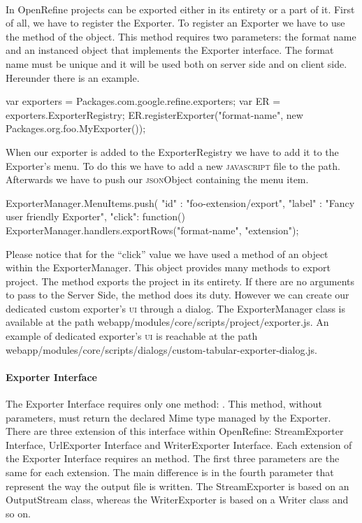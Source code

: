 \paragraph{} In OpenRefine projects can be exported either in its entirety or a part of it. First of all, we have to register the Exporter. To register an Exporter we have to use the  method of the  object. This method requires two parameters: the format name and an instanced object that implements the Exporter interface. The format name must be unique and it will be used both on server side and on client side. Hereunder there is an example.
\begin{code}
var exporters = Packages.com.google.refine.exporters;
var ER = exporters.ExporterRegistry;
ER.registerExporter("format-name", 
     new Packages.org.foo.MyExporter()); 
\end{code} 
When our exporter is added to the ExporterRegistry we have to add it to the Exporter's menu. To do this we have to add a new \textsc{javascript} file to the path. Afterwards we have to push our \textsc{json}Object containing the menu item. 
\begin{code}
ExporterManager.MenuItems.push(
{
   "id" : "foo-extension/export",
   "label" : "Fancy user friendly Exporter",
   "click": function() { 
      ExporterManager.handlers.exportRows("format-name",
                                          "extension");
   }
}
\end{code}
Please notice that for the ``click'' value we have used a method of an object within the ExporterManager. This object provides many methods to export project. The  method exports the project in its entirety. If there are no arguments to pass to the Server Side, the  method does its duty. However we can create our dedicated custom exporter's \textsc{ui} through a dialog. The ExporterManager class is available at the path \textsf{webapp/modules/core/scripts/project/exporter.js}. An example of dedicated exporter's \textsc{ui} is reachable at the path \textsf{webapp/modules/core/scripts/dialogs/custom-tabular-exporter-dialog.js}.

\paragraph{Exporter Interface} The Exporter Interface requires only one method: . This method, without parameters, must return the declared Mime type managed by the Exporter. There are three extension of this interface within OpenRefine: StreamExporter Interface, UrlExporter Interface and WriterExporter Interface. Each extension of the Exporter Interface requires an  method. The first three parameters are the same for each extension. The main difference is in the fourth parameter that represent the way the output file is written. The StreamExporter is based on an OutputStream class, whereas the WriterExporter is based on a Writer class and so on.